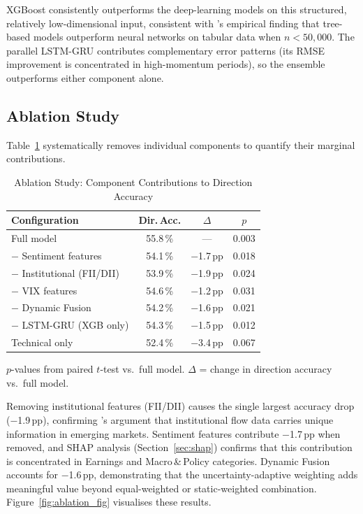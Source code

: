 \documentclass[ASNA,twocolumn]{USG}
\begin{document}
XGBoost consistently outperforms the deep-learning models on this structured,
relatively low-dimensional input, consistent with \citet{grinsztajn2022}'s
empirical finding that tree-based models outperform neural networks on tabular
data when $n < 50{,}000$. The parallel LSTM-GRU contributes complementary
error patterns (its RMSE improvement is concentrated in high-momentum periods),
so the ensemble outperforms either component alone.

\subsection{Ablation Study}

Table~\ref{tab:ablation} systematically removes individual components to
quantify their marginal contributions.

\begin{table}[!t]
\caption{Ablation Study: Component Contributions to Direction Accuracy\label{tab:ablation}}
\begin{tabular*}{\columnwidth}{@{\extracolsep\fill}lccc@{\extracolsep\fill}}
\toprule
\textbf{Configuration} & \textbf{Dir.\,Acc.} & \textbf{$\Delta$} & \textbf{$p$} \\
\midrule
Full model               & 55.8\,\% & ---     & 0.003 \\
$-$ Sentiment features   & 54.1\,\% & $-$1.7\,pp & 0.018 \\
$-$ Institutional (FII/DII) & 53.9\,\% & $-$1.9\,pp & 0.024 \\
$-$ VIX features         & 54.6\,\% & $-$1.2\,pp & 0.031 \\
$-$ Dynamic Fusion       & 54.2\,\% & $-$1.6\,pp & 0.021 \\
$-$ LSTM-GRU (XGB only)  & 54.3\,\% & $-$1.5\,pp & 0.012 \\
Technical only           & 52.4\,\% & $-$3.4\,pp & 0.067 \\
\bottomrule
\end{tabular*}
\begin{tablenotes}
\item[\textit{Note:}] $p$-values from paired $t$-test vs.\ full model.
$\Delta$ = change in direction accuracy vs.\ full model.
\end{tablenotes}
\end{table}

Removing institutional features (FII/DII) causes the single largest
accuracy drop ($-$1.9\,pp), confirming \citet{bekaert2002}'s argument
that institutional flow data carries unique information in emerging markets.
Sentiment features contribute $-$1.7\,pp when removed, and SHAP analysis
(Section~\ref{sec:shap}) confirms that this contribution is concentrated
in Earnings and Macro\,\&\,Policy categories. Dynamic Fusion accounts for
$-$1.6\,pp, demonstrating that the uncertainty-adaptive weighting adds
meaningful value beyond equal-weighted or static-weighted combination.
Figure~\ref{fig:ablation_fig} visualises these results.
\end{document}
